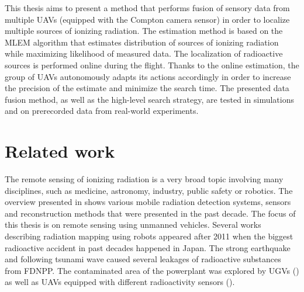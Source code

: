 This thesis aims to present a method that performs fusion of sensory data from multiple \ac{UAV}s (equipped with the Compton camera sensor) in order to localize multiple sources of ionizing radiation.
The estimation method is based on the \ac{MLEM} algorithm that estimates distribution of sources of ionizing radiation while maximizing likelihood of measured data.
The localization of radioactive sources is performed online during the flight.
Thanks to the online estimation, the group of \ac{UAV}s autonomously adapts its actions accordingly in order to increase the precision of the estimate and minimize the search time.
The presented data fusion method, as well as the high-level search strategy, are tested in simulations and on prerecorded data from real-world experiments.

\section{Related work}
The remote sensing of ionizing radiation is a very broad topic involving many disciplines, such as medicine, astronomy, industry, public safety or robotics.
The overview presented in \cite{radiation_detection_systems_overview} shows various mobile radiation detection systems, sensors and reconstruction methods that were presented in the past decade.
The focus of this thesis is on remote sensing using unmanned vehicles.
Several works describing radiation mapping using robots appeared after 2011 when the biggest radioactive accident in past decades happened in Japan.
The strong earthquake and following tsunami wave caused several leakages of radioactive substances from \ac{FDNPP}.
The contaminated area of the powerplant was explored by \ac{UGV}s (\cite{fuku2012,fuku_compton}) as well as \ac{UAV}s equipped with different radioactivity sensors (\cite{sanada2015, towler2012, Jiang2015, Mochizuki_2017, sato_drone_compton_camera_2018}).

